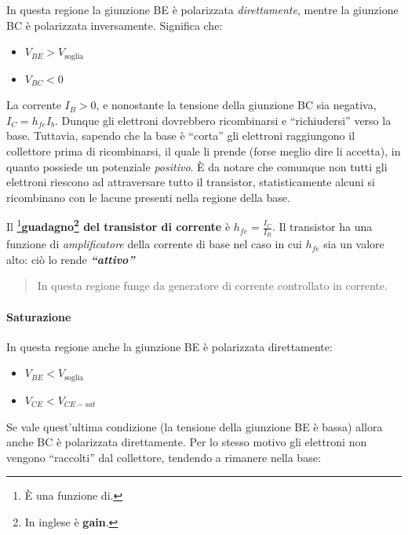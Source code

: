 \documentclass[
]{book}
\providecommand{\tightlist}{%
  \setlength{\itemsep}{0pt}\setlength{\parskip}{0pt}}
\begin{document}
In questa regione la giunzione BE è polarizzata \emph{direttamente},
mentre la giunzione BC è polarizzata inversamente. Significa che:

\begin{itemize}
\tightlist
\item
  \(V_{BE} > V_{\text{soglia}}\)
\item
  \(V_{BC} < 0\)
\end{itemize}

La corrente \(I_B >0\), e nonostante la tensione della giunzione BC sia
negativa, \(I_C= h_{fe}I_{b}\). \newline Dunque gli elettroni dovrebbero
ricombinarsi e ``richiudersi'' verso la base. Tuttavia, sapendo che la
base è ``corta'' gli elettroni raggiungono il collettore prima di
ricombinarsi, il quale li prende (forse meglio dire li accetta), in
quanto possiede un potenziale \emph{positivo}. È da notare che comunque
non tutti gli elettroni riescono ad attraversare tutto il transistor,
statisticamente alcuni si ricombinano con le lacune presenti nella
regione della base.

Il \footnote{È una funzione di.}\textbf{guadagno\footnote{In inglese è
  \textbf{gain}.} del transistor di corrente} è
\(h_{fe}=\frac{I_C}{I_B}\). Il transistor ha una funzione di
\emph{amplificatore} della corrente di base nel caso in cui \(h_{fe}\)
sia un valore alto: ciò lo rende \textbf{\emph{``attivo''}}

\begin{quote}
In questa regione funge da generatore di corrente controllato in
corrente.
\end{quote}

\paragraph{Saturazione}\label{saturazione}

In questa regione anche la giunzione BE è polarizzata direttamente:

\begin{itemize}
\tightlist
\item
  \(V_{BE}< V_{\text{soglia}}\)
\item
  \(V_{CE}<V_{CE -sat}\)
\end{itemize}

Se vale quest'ultima condizione (la tensione della giunzione BE è bassa)
allora anche BC è polarizzata direttamente. Per lo stesso motivo gli
elettroni non vengono ``raccolti'' dal collettore, tendendo a rimanere
nella base:
\end{document}

